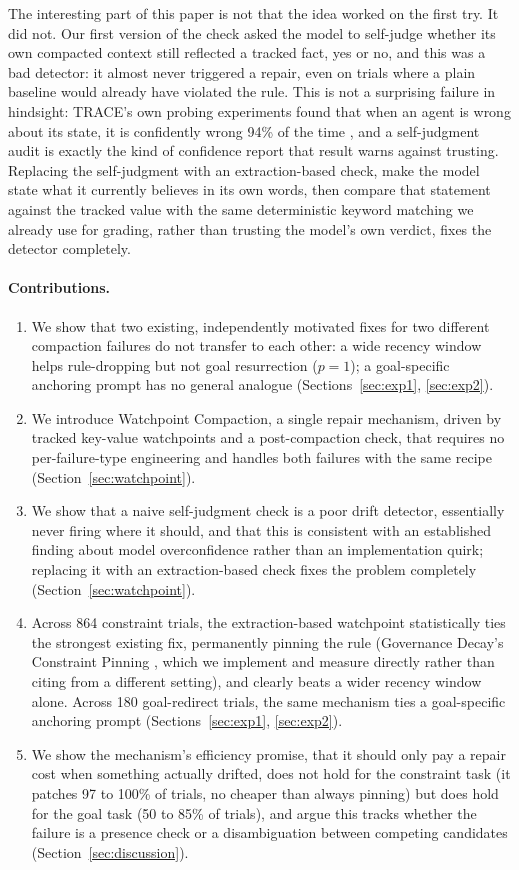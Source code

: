 \documentclass[11pt]{article}
\begin{document}
The interesting part of this paper is not that the idea worked on the first try. It did not. Our first version of the check asked the model to self-judge whether its own compacted context still reflected a tracked fact, yes or no, and this was a bad detector: it almost never triggered a repair, even on trials where a plain baseline would already have violated the rule. This is not a surprising failure in hindsight: TRACE's own probing experiments found that when an agent is wrong about its state, it is confidently wrong 94\% of the time \cite{trace}, and a self-judgment audit is exactly the kind of confidence report that result warns against trusting. Replacing the self-judgment with an extraction-based check, make the model state what it currently believes in its own words, then compare that statement against the tracked value with the same deterministic keyword matching we already use for grading, rather than trusting the model's own verdict, fixes the detector completely.

\paragraph{Contributions.}
\begin{enumerate}
\item We show that two existing, independently motivated fixes for two different compaction failures do not transfer to each other: a wide recency window helps rule-dropping but not goal resurrection ($p=1$); a goal-specific anchoring prompt has no general analogue (Sections~\ref{sec:exp1}, \ref{sec:exp2}).
\item We introduce Watchpoint Compaction, a single repair mechanism, driven by tracked key-value watchpoints and a post-compaction check, that requires no per-failure-type engineering and handles both failures with the same recipe (Section~\ref{sec:watchpoint}).
\item We show that a naive self-judgment check is a poor drift detector, essentially never firing where it should, and that this is consistent with an established finding about model overconfidence rather than an implementation quirk; replacing it with an extraction-based check fixes the problem completely (Section~\ref{sec:watchpoint}).
\item Across 864 constraint trials, the extraction-based watchpoint statistically ties the strongest existing fix, permanently pinning the rule (Governance Decay's Constraint Pinning \cite{governancedecay}, which we implement and measure directly rather than citing from a different setting), and clearly beats a wider recency window alone. Across 180 goal-redirect trials, the same mechanism ties a goal-specific anchoring prompt (Sections~\ref{sec:exp1}, \ref{sec:exp2}).
\item We show the mechanism's efficiency promise, that it should only pay a repair cost when something actually drifted, does not hold for the constraint task (it patches 97 to 100\% of trials, no cheaper than always pinning) but does hold for the goal task (50 to 85\% of trials), and argue this tracks whether the failure is a presence check or a disambiguation between competing candidates (Section~\ref{sec:discussion}).
\end{enumerate}
\end{document}

